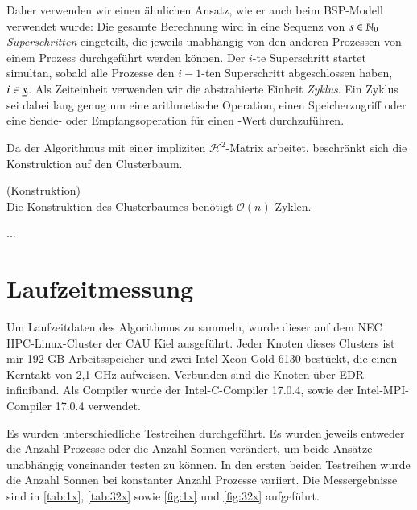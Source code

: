   Daher verwenden wir einen ähnlichen Ansatz, wie er auch beim BSP-Modell \citep{bsp} verwendet wurde: Die gesamte Berechnung wird in eine Sequenz von $s \in \mathbb{N}_0$ \textit{Superschritten} eingeteilt,
  die jeweils unabhängig von den anderen Prozessen von einem Prozess durchgeführt werden können. Der $i$-te Superschritt startet simultan, sobald alle Prozesse den $i-1$-ten Superschritt abgeschlossen
  haben, $i \in \haken{s}$. Als Zeiteinheit verwenden wir die abstrahierte Einheit \textit{Zyklus}. Ein Zyklus sei dabei lang genug um eine arithmetische Operation, einen Speicherzugriff oder eine Sende-
  oder Empfangsoperation für einen -Wert durchzuführen.
  
  Da der Algorithmus mit einer impliziten $\mathcal{H}^2$-Matrix arbeitet, beschränkt sich die Konstruktion auf den Clusterbaum.
  
  \begin{lem}
    (Konstruktion)\\
    Die Konstruktion des Clusterbaumes benötigt $\mathcal{O}(n)$ Zyklen.
  \end{lem}
  
  ...
  
  \section{Laufzeitmessung}
  Um Laufzeitdaten des Algorithmus zu sammeln, wurde dieser auf dem NEC HPC-Linux-Cluster der CAU Kiel ausgeführt. Jeder Knoten dieses Clusters ist mir 192 GB Arbeitsspeicher und zwei Intel Xeon Gold 
  6130 bestückt, die einen Kerntakt von 2,1 GHz aufweisen. Verbunden sind die Knoten über EDR infiniband. Als Compiler wurde der Intel-C-Compiler 17.0.4, sowie der Intel-MPI-Compiler 17.0.4 verwendet.
  
  Es wurden unterschiedliche Testreihen durchgeführt. Es wurden jeweils entweder die Anzahl Prozesse oder die Anzahl Sonnen verändert, um beide Ansätze unabhängig voneinander testen zu können.
  In den ersten beiden Testreihen wurde die Anzahl Sonnen bei konstanter Anzahl Prozesse variiert. Die Messergebnisse sind in \autoref{tab:1x}, \autoref{tab:32x} sowie \autoref{fig:1x} und 
  \autoref{fig:32x} aufgeführt.
  
  
